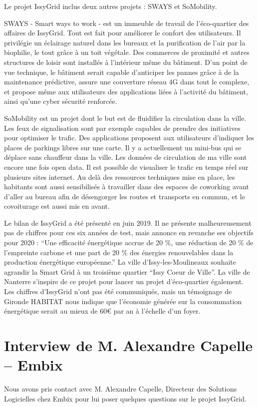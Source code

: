 Le projet IssyGrid inclus deux autres projets : SWAYS et SoMobility.

SWAYS - Smart ways to work - est un immeuble de travail de l'éco-quartier des affaires de IssyGrid.
Tout est fait pour améliorer le confort des utilisateurs.
Il privilégie un éclairage naturel dans les bureaux et la purification de l'air par la biophilie,
le tout grâce à un toit végétale. Des commerces de proximité et autres structures de loisir
sont installés à l'intérieur même du bâtiment. D'un point de vue technique, le bâtiment serait
capable d'anticiper les pannes grâce à de la maintenance prédictive, assure une couverture réseau
4G dans tout le complexe, et propose même aux utilisateurs des applications liées à l'activité du
bâtiment, ainsi qu'une cyber sécurité renforcée.

SoMobility est un projet dont le but est de fluidifier la circulation dans la ville. Les feux de
signalisation sont par exemple capables de prendre des initiatives pour optimiser le trafic.
Des applications proposent aux utilisateurs d'indiquer les places de parkings libres sur une carte.
Il y a actuellement un mini-bus qui se déplace sans chauffeur dans la ville.
Les données de circulation de ma ville sont encore une fois open data. Il est possible de visualiser
le trafic en temps réel sur plusieurs sites internet.
Au delà des ressources techniques mise en place, les habitants sont aussi sensibilisés à travailler
dans des espaces de coworking avant d'aller au bureau afin de désengorger les routes et transports
en commun, et le covoiturage est aussi mis en avant.

Le bilan de IssyGrid a été présenté en juin 2019.
Il ne présente malheureusement pas de chiffres pour ces six années de test, mais annonce en revanche
ses objectifs pour 2020 : ``Une efficacité énergétique accrue de 20 \%, une réduction de 20 \%
de l’empreinte carbone et une part de 20 \% des énergies renouvelables dans la production
énergétique européenne.''
La ville d'Issy-les-Moulineaux souhaite agrandir la Smart Grid à un troisième quartier
``Issy Coeur de Ville''. La ville de Nanterre s'inspire de ce projet pour lancer un projet
d'éco-quartier également.
Les chiffres d'IssyGrid n'ont pas été communiqués, mais un témoignage de Gironde HABITAT nous indique
que l'économie générée sur la consommation énergétique serait au mieux de 60€ par an à l'échelle d'un
foyer.

\section{Interview de M. Alexandre Capelle – Embix}
Nous avons pris contact avec M. Alexandre Capelle, Directeur des Solutions Logicielles chez Embix pour
lui poser quelques questions sur le projet IssyGrid.

